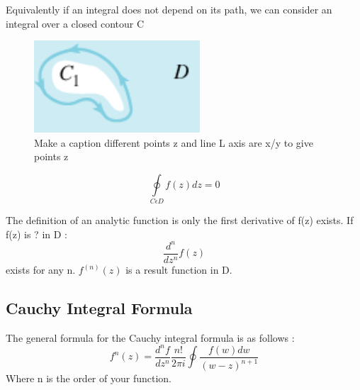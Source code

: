 \documentclass{article}
\newcommand{\be}{\begin{equation}}
\newcommand{\ee}{\end{equation}}
\begin{document}
Equivalently if an integral does not depend on its path, we can consider an integral over a closed contour C
\begin{figure}[h]
  \centering
  \includegraphics{Figures/contour.png}
    \caption{Make a caption different points z and line L axis are x/y to give points z}
\end{figure}

\be
\oint\limits_{C \epsilon D} f(z) dz = 0
\ee

The definition of an analytic function is only the first derivative of f(z) exists.
If f(z) is ? in D :
\be
\frac{d^n}{dz^n} f(z)
\ee
exists for any n. $f^(n)(z)$ is a result function in D.


\subsection*{Cauchy Integral Formula}
The general formula for the Cauchy integral formula is as follows :
\be
f^{n}(z) = \frac{d^n f}{dz^n}  \frac{n!}{2\pi i } \oint \frac{f(w) dw}{(w-z)^{n+1}}
\ee
Where n is the order of your function.
\end{document}
